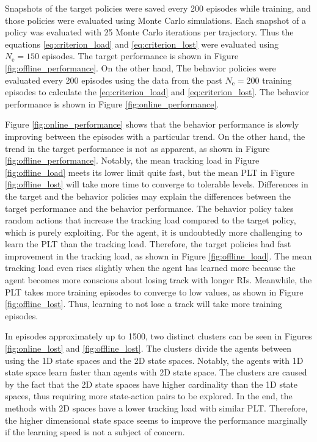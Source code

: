 \documentclass[english, 12pt, a4paper, elec, utf8, a-1b, online]{aaltothesis}
\newcommand{\Ne}{N_\text{e}}
\begin{document}
Snapshots of the target policies were saved every 200 episodes while training, and those policies were evaluated using Monte Carlo simulations.
Each snapshot of a policy was evaluated with 25 Monte Carlo iterations per trajectory.
Thus the equations \eqref{eq:criterion_load} and \eqref{eq:criterion_lost} were evaluated using $\Ne=150$ episodes.
The target performance is shown in Figure \ref{fig:offline_performance}.
On the other hand, The behavior policies were evaluated every 200 episodes using the data from the past $\Ne=200$ training episodes to calculate the \eqref{eq:criterion_load} and \eqref{eq:criterion_lost}.
The behavior performance is shown in Figure \ref{fig:online_performance}.

Figure \ref{fig:online_performance} shows that the behavior performance is slowly improving between the episodes with a particular trend.
On the other hand, the trend in the target performance is not as apparent, as shown in Figure \ref{fig:offline_performance}.
Notably, the mean tracking load in Figure \ref{fig:offline_load} meets its lower limit quite fast, but the mean PLT in Figure \ref{fig:offline_lost} will take more time to converge to tolerable levels.
Differences in the target and the behavior policies may explain the differences between the target performance and the behavior performance.
The behavior policy takes random actions that increase the tracking load compared to the target policy, which is purely exploiting.
For the agent, it is undoubtedly more challenging to learn the PLT than the tracking load.
Therefore, the target policies had fast improvement in the tracking load, as shown in Figure \ref{fig:offline_load}. 
The mean tracking load even rises slightly when the agent has learned more because the agent becomes more conscious about losing track with longer RIs.
Meanwhile, the PLT takes more training episodes to converge to low values, as shown in Figure \ref{fig:offline_lost}.
Thus, learning to not lose a track will take more training episodes.


In episodes approximately up to 1500, two distinct clusters can be seen in Figures \ref{fig:online_lost} and \ref{fig:offline_lost}.
The clusters divide the agents between using the 1D state spaces and the 2D state spaces.
Notably, the agents with 1D state space learn faster than agents with 2D state space.
The clusters are caused by the fact that the 2D state spaces have higher cardinality than the 1D state spaces, thus requiring more state-action pairs to be explored.
In the end, the methods with 2D spaces have a lower tracking load with similar PLT.
Therefore, the higher dimensional state space seems to improve the performance marginally if the learning speed is not a subject of concern.
\end{document}
